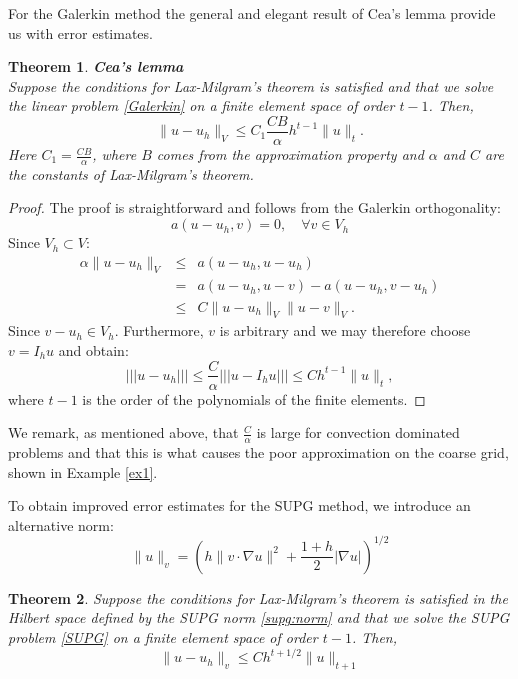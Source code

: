 \documentclass[a4paper,11pt]{amsart}
\newcommand{\norm}[1]{ |\!|\!| #1 |\!|\!|}
\newtheorem{theorem}{Theorem}[section]
\begin{document}
For the Galerkin method the general and elegant result of Cea's lemma
provide us with error estimates. 

\begin{theorem}{\textbf{Cea's lemma}} \\
Suppose the conditions for Lax-Milgram's theorem is satisfied and that
we solve the linear problem \eqref{Galerkin} on a finite element space
of order $t-1$. Then,     
\[
\|u-u_h\|_V \leq   C_1 \frac{C B}{\alpha}  h^{t-1} \|u\|_t.   
\]
Here $C_1 = \frac{C B}{\alpha}$, where $B$ comes from the approximation property 
and $\alpha$ and $C$ are the constants of Lax-Milgram's theorem.    
\end{theorem}

\begin{proof}
The proof is straightforward and follows from the Galerkin orthogonality: 
\[
a(u - u_h, v) = 0, \quad \forall v \in V_h 
\]
Since $V_h \subset V$: 
\begin{eqnarray*}
\alpha \|u-u_h\|_{V} &\le& a(u-u_h, u-u_h)    \\ 
 &=& a(u-u_h, u-v) - a(u-u_h, v-u_h) \\ 
 &\le& C \|u-u_h\|_V \| u-v\|_V  .      
\end{eqnarray*}
Since $v-u_h\in V_h$. Furthermore,  $v$ is arbitrary and we may therefore choose $v = I_h u$ and obtain:  
\[
\norm{u-u_h} \leq \frac{C}{\alpha}  \norm{u - I_h u} \le  C h^{t-1} \|u\|_t,   
\]
where $t-1$ is the order of the polynomials of the finite elements. 
\end{proof}

We remark, as mentioned above, that 
$\frac{C}{\alpha}$ is large for convection dominated problems and that this is what
causes the poor approximation on the coarse grid, shown in Example \ref{ex1}.  


To obtain improved error estimates for the SUPG method, we introduce  
an alternative norm: 
\begin{equation}
\label{supg:norm}
\|u\|_v = \left(h\|v\cdot\nabla u\|^2 +  \frac{1+h}{2}|\nabla u|\right)^{1/2}
\end{equation}


\begin{theorem}
Suppose the conditions for Lax-Milgram's theorem is satisfied 
in the Hilbert space defined by the SUPG norm \eqref{supg:norm}
and that
we solve the SUPG problem \eqref{SUPG} on a finite element space
of order $t-1$. Then,  
\[\|u-u_h\|_v \leq Ch^{t+1/2}\|u\|_{t+1}\]
\end{theorem}
\end{document}
